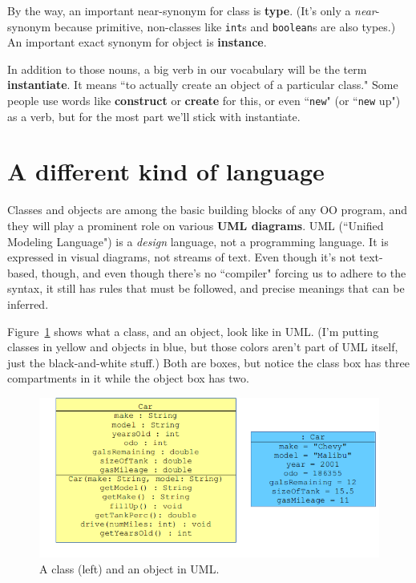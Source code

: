 By the way, an important near-synonym for class is \textbf{type}. (It's only a
\textit{near}-synonym because primitive, non-classes like \texttt{int}s and
\texttt{boolean}s are also types.) An important exact synonym for object is
\textbf{instance}.

In addition to those nouns, a big verb in our vocabulary will be the term
\textbf{instantiate}. It means ``to actually create an object of a particular
class." Some people use words like \textbf{construct} or \textbf{create} for
this, or even ``\texttt{new}" (or ``\texttt{new} up") as a verb, but for the
most part we'll stick with instantiate.


\section{A different kind of language}
\label{sec:UMLclasses}

Classes and objects are among the basic building blocks of any OO program, and
they will play a prominent role on various \textbf{UML diagrams}. UML
(``Unified Modeling Language") is a \textit{design} language, not a
programming language. It is expressed in visual diagrams, not streams of text.
Even though it's not text-based, though, and even though there's no
``compiler" forcing us to adhere to the syntax, it still has rules that must
be followed, and precise meanings that can be inferred.

Figure~\ref{fig:classObject} shows what a class, and an object, look like in
UML. (I'm putting classes in yellow and objects in blue, but those colors
aren't part of UML itself, just the black-and-white stuff.) Both are boxes,
but notice the class box has three compartments in it while the object box has
two.

\begin{figure}[ht]
\centering
\includegraphics[width=1.0\textwidth]{classObject.png}
\caption{A class (left) and an object in UML.}
\label{fig:classObject}
\end{figure}

